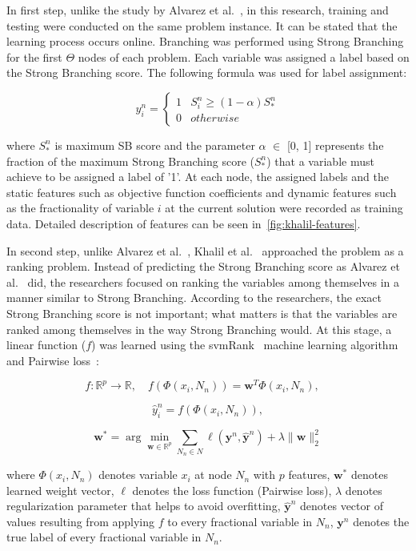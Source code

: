 In first step, unlike the study by Alvarez et al.~\cite{alvarezMachineLearningBasedApproximation2017}, in this research, training and testing were conducted on the same problem instance.
It can be stated that the learning process occurs online.
Branching was performed using Strong Branching for the first $\Theta$ nodes of each problem.
Each variable was assigned a label based on the Strong Branching score.
The following formula was used for label assignment:

\[ y_i^n = \begin{cases}
      1 & S_i^n\geq (1-\alpha)S_*^n \\
      0 & otherwise
   \end{cases}
\]

where $S_*^n$ is maximum SB score and the parameter $\alpha$ $\in$ [0, 1] represents the fraction of the maximum Strong Branching score ($S_*^n$) that a variable must achieve to be assigned a label of '1'.
At each node, the assigned labels and the static features such as objective function coefficients and dynamic features such as the fractionality of variable $i$ at the current solution were recorded as training data.
Detailed description of features can be seen in~\ref{fig:khalil-features}.


In second step, unlike Alvarez et al.~\cite{alvarezMachineLearningBasedApproximation2017}, Khalil et al.~\cite{khalilLearningBranchMixed2016} approached the problem as a ranking problem.
Instead of predicting the Strong Branching score as Alvarez et al.~\cite{alvarezMachineLearningBasedApproximation2017} did, the researchers focused on ranking the variables among themselves in a manner similar to Strong Branching.
According to the researchers, the exact Strong Branching score is not important; what matters is that the variables are ranked among themselves in the way Strong Branching would.
At this stage, a linear function ($f$) was learned using the svmRank~\cite{joachimsTrainingLinearSVMs2006} machine learning algorithm and Pairwise loss~\cite{joachimsOptimizingSearchEngines}:

\[
f: \mathbb{R}^p \rightarrow \mathbb{R}, \quad
f\left(\Phi(x_i, N_n)\right) = \mathbf{w}^T \Phi(x_i, N_n), \quad
\]

\[
\hat{y}_i^n = f\left(\Phi(x_i, N_n)\right),
\]

\[
\mathbf{w}^* = \arg\min_{\mathbf{w} \in \mathbb{R}^p}
\sum_{N_n \in N} \ell(\mathbf{y}^n, \hat{\mathbf{y}}^n)
+ \lambda \| \mathbf{w} \|_2^2
\]

where $\Phi(x_i, N_n)$ denotes variable $x_i$ at node $N_n$ with $p$ features, $\mathbf{w}^*$ denotes learned weight vector, $\ell$ denotes the loss function (Pairwise loss), $\lambda$ denotes regularization parameter that helps to avoid overfitting, $\hat{\mathbf{y}}^n$ denotes vector of values resulting from applying $f$ to every fractional variable in $N_n$, $\mathbf{y}^n$ denotes the true label of every fractional variable in $N_n$.



